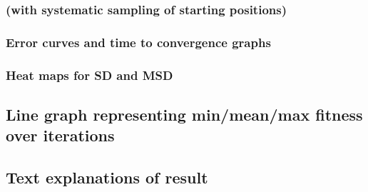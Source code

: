 \documentclass{scrartcl}
\begin{document}
\subsubsection{(with systematic sampling of starting positions)}
\subsubsection{Error curves and time to convergence graphs}
\subsubsection{Heat maps for SD and MSD}
\subsection{Line graph representing min/mean/max fitness over iterations}
\subsection{Text explanations of result}








%



\end{document}
